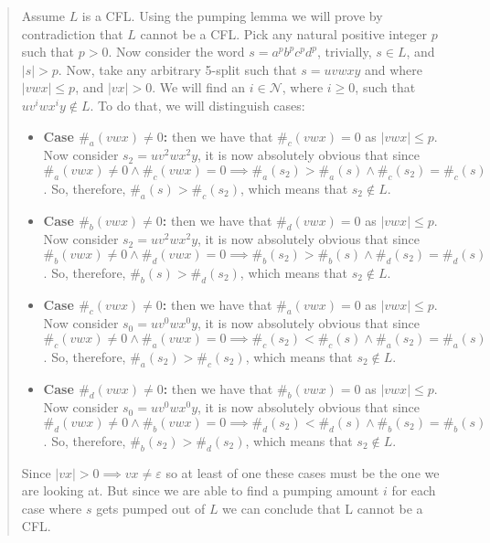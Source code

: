 \documentclass[a4paper]{article}
\newcommand{\eps}{\varepsilon}
\begin{document}
        \begin{quote}
            Assume $L$ is a CFL. Using the pumping lemma we will prove by contradiction that $L$ cannot be a CFL. Pick any natural positive integer $p$ such that $p > 0$. Now consider the word $s = a^p b^p c^p d^p$, trivially, $s\in L$, and $|s| > p$. Now, take any arbitrary 5-split such that $s = uvwxy$ and where $|vwx| \leq p$, and $|vx| > 0$. We will find an $i \in \mathcal{N}$, where $i \geq 0$, such that $u v^i w x^i y \not\in L$. To do that, we will distinguish cases:
            \begin{itemize}
                \item \textbf{Case $\#_a(vwx) \neq 0$:} then we have that $\#_c(vwx) = 0$ as $|vwx| \leq p$. Now consider $s_2 = uv^2wx^2y$, it is now absolutely obvious that since $\#_a(vwx) \neq 0 \wedge \#_c(vwx) = 0 \implies \#_a(s_2) > \#_a(s) \wedge \#_c(s_2) = \#_c(s)$. So, therefore, $\#_a(s) > \#_c(s_2)$, which means that $s_2 \not\in L$.
                \item \textbf{Case $\#_b(vwx) \neq 0$:} then we have that $\#_d(vwx) = 0$ as $|vwx| \leq p$. Now consider $s_2 = uv^2wx^2y$, it is now absolutely obvious that since $\#_b(vwx) \neq 0 \wedge \#_d(vwx) = 0 \implies \#_b(s_2) > \#_b(s) \wedge \#_d(s_2) = \#_d(s)$. So, therefore, $\#_b(s) > \#_d(s_2)$, which means that $s_2 \not\in L$.
                \item \textbf{Case $\#_c(vwx) \neq 0$:} then we have that $\#_a(vwx) = 0$ as $|vwx| \leq p$. Now consider $s_0 = uv^0wx^0y$, it is now absolutely obvious that since $\#_c(vwx) \neq 0 \wedge \#_a(vwx) = 0 \implies \#_c(s_2) < \#_c(s) \wedge \#_a(s_2) = \#_a(s)$. So, therefore, $\#_a(s_2) > \#_c(s_2)$, which means that $s_2 \not\in L$.
                \item \textbf{Case $\#_d(vwx) \neq 0$:} then we have that $\#_b(vwx) = 0$ as $|vwx| \leq p$. Now consider $s_0 = uv^0wx^0y$, it is now absolutely obvious that since $\#_d(vwx) \neq 0 \wedge \#_b(vwx) = 0 \implies \#_d(s_2) < \#_d(s) \wedge \#_b(s_2) = \#_b(s)$. So, therefore, $\#_b(s_2) > \#_d(s_2)$, which means that $s_2 \not\in L$.
            \end{itemize}
            Since $|vx| > 0 \implies vx \neq \eps$ so at least of one these cases must be the one we are looking at. But since we are able to find a pumping amount $i$ for each case where $s$ gets pumped out of $L$ we can conclude that L cannot be a CFL.
        \end{quote}
\end{document}
